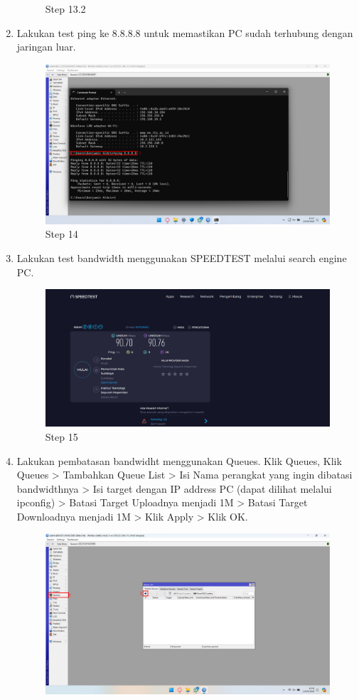 \begin{center}
\begin{enumerate}
\begin{figure}[H]
			\caption{Step 13.2}
			\label{fig:Step 14.2}
		\end{figure}
        \item Lakukan test ping ke 8.8.8.8 untuk memastikan PC sudah terhubung dengan jaringan luar.
        \begin{figure}[H]
			\centering
			\includegraphics[width=0.8\linewidth]{P3/img/Step 15.png}
			\caption{Step 14}
			\label{fig:Step 14}
		\end{figure}
        \item Lakukan test bandwidth menggunakan SPEEDTEST melalui search engine PC.
        \begin{figure}[H]
			\centering
			\includegraphics[width=0.8\linewidth]{P3/img/Step 16.png}
			\caption{Step 15}
			\label{fig:Step 15}
		\end{figure}
        \item Lakukan pembatasan bandwidht menggunakan Queues. Klik Queues,  Klik Queues > Tambahkan Queue List > Isi Nama perangkat yang ingin dibatasi bandwidthnya > Isi target dengan IP address PC (dapat dilihat melalui ipconfig) > Batasi Target Uploadnya menjadi 1M > Batasi Target Downloadnya menjadi 1M > Klik Apply > Klik OK.
        \begin{figure}[H]
			\centering
			\includegraphics[width=0.8\linewidth]{P3/img/Step 17.png}

\end{figure}
\end{enumerate}
\end{center}
